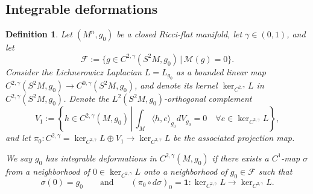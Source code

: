 \documentclass[12pt]{amsart}
\renewcommand{\1}{{\mathbf 1}}
\theoremstyle{others}
\newtheorem{defn}[thm]{Definition}
\numberwithin{equation}{section}
\begin{document}
\subsection{Integrable deformations} \label{subsect integrability}

\begin{defn} \label{defn integrable closed mfld}
    Let $(M^n, g_0)$ be a closed Ricci-flat manifold, let $\gamma \in (0,1)$, and let
        $$\mathcal F := \{ g \in C^{2,\gamma}(S^2 M, g_0) \, | \, \mathcal M(g) = 0 \} .$$
    Consider the Lichnerowicz Laplacian $L = L_{g_0}$ as a bounded linear map $C^{2, \gamma}(S^2 M, g_0) \to C^{0, \gamma}(S^2 M, g_0)$, and denote its kernel $\ker_{C^{2, \gamma}} L$ in $C^{2, \gamma}(S^2 M, g_0)$.
    Denote the $L^2(S^2 M, g_0)$-orthogonal complement 
        $$V_1 := \left\{ h \in C^{2, \gamma}(M, g_0) \, \left| \, \int_M \langle h, e \rangle_{g_0} dV_{g_0} = 0 \quad \forall e \in \ker_{C^{2, \gamma}} L \right.  \right\} ,$$
    and let $\pi_0 : C^{2, \gamma} = \ker_{C^{2, \gamma} } L \oplus V_1 \to \ker_{C^{2, \gamma}}L$ be the associated projection map.

    We say $g_0$ has \emph{integrable deformations in $C^{2, \gamma}(M, g_0)$} if there exists a $C^1$-map $\sigma$ from a neighborhood of $0 \in \ker_{C^{2, \gamma}} L$ onto a neighborhood of $g_0 \in \mathcal F$ such that 
        $$\sigma(0) = g_0 \qquad \text{and} \qquad \left( \pi_0 \circ d \sigma \right)_0 = \mathbf 1 : \ker_{C^{2, \gamma}} L \to \ker_{C^{2, \gamma}}L.$$
\end{defn}
\end{document}
